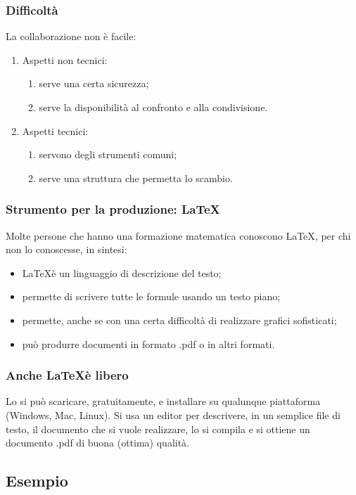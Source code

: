 \documentclass{beamer} %
\begin{document}
\begin{frame}\frametitle{Difficoltà}

La collaborazione non è facile:
\begin{enumerate} [<+->]
\item Aspetti non tecnici:
\begin{enumerate}
\item serve una certa sicurezza;
\item serve la disponibilità al confronto e alla condivisione.
\end{enumerate}
\item Aspetti tecnici:
\begin{enumerate}
\item servono degli strumenti comuni;
\item serve una struttura che permetta lo scambio.
\end{enumerate}
\end{enumerate}

\end{frame}


\begin{frame}\frametitle{Strumento per la produzione: \LaTeX}

Molte persone che hanno una formazione matematica conoscono \LaTeX, 
per chi non lo conoscesse, in sintesi:
\begin{itemize} %
\item \LaTeX è un linguaggio di descrizione del testo; 
\item permette di scrivere tutte le formule usando un testo piano;
\item permette, anche se con una certa difficoltà di realizzare grafici 
sofisticati;
\item può produrre documenti in formato .pdf o in altri formati.
\end{itemize}

\end{frame}


\begin{frame}\frametitle{Anche \LaTeX è libero}

Lo si può scaricare, gratuitamente, e installare 
su qualunque piattaforma (Windows, Mac, Linux).
\spause
Si usa un editor per descrivere, in un semplice file di testo, 
il documento che si vuole realizzare, lo si compila e si ottiene un 
documento .pdf di buona (ottima) qualità.

\end{frame}


\subsection{Esempio} 
\end{document}
